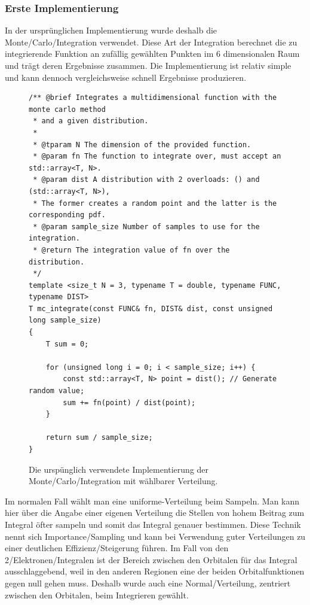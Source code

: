 \subsubsection{Erste Implementierung}
In der ursprünglichen Implementierung wurde deshalb die Monte\-/Carlo\-/Integration verwendet.
Diese Art der Integration berechnet die zu integrierende Funktion an zufällig gewählten Punkten
im 6 dimensionalen Raum und trägt deren Ergebnisse zusammen. Die Implementierung ist relativ simple
und kann dennoch vergleichsweise schnell Ergebnisse produzieren.
\begin{figure}[H]
\begin{verbatim}
/** @brief Integrates a multidimensional function with the monte carlo method
 * and a given distribution.
 *
 * @tparam N The dimension of the provided function.
 * @param fn The function to integrate over, must accept an std::array<T, N>.
 * @param dist A distribution with 2 overloads: () and (std::array<T, N>),
 * The former creates a random point and the latter is the corresponding pdf.
 * @param sample_size Number of samples to use for the integration.
 * @return The integration value of fn over the distribution.
 */
template <size_t N = 3, typename T = double, typename FUNC, typename DIST>
T mc_integrate(const FUNC& fn, DIST& dist, const unsigned long sample_size)
{
    T sum = 0;
 
    for (unsigned long i = 0; i < sample_size; i++) {
        const std::array<T, N> point = dist(); // Generate random value;
        sum += fn(point) / dist(point);
    }

    return sum / sample_size;
}
\end{verbatim}
\caption{Die urspünglich verwendete Implementierung der Monte\-/Carlo\-/Integration mit wählbarer Verteilung.}
\end{figure}

Im normalen Fall wählt man eine uniforme-Verteilung beim Sampeln. Man kann hier
über die Angabe einer eigenen Verteilung die Stellen von hohem Beitrag
zum Integral öfter sampeln und somit das Integral genauer bestimmen.
Diese Technik nennt sich Importance\-/Sampling
und kann bei Verwendung guter Verteilungen zu einer deutlichen Effizienz\-/Steigerung führen.
Im Fall von den 2\-/Elektronen\-/Integralen ist der Bereich
zwischen den Orbitalen für das Integral ausschlaggebend,
weil in den anderen Regionen eine der beiden Orbitalfunktionen gegen null gehen muss.
Deshalb wurde auch eine Normal\-/Verteilung, zentriert zwischen den Orbitalen,
beim Integrieren gewählt.

